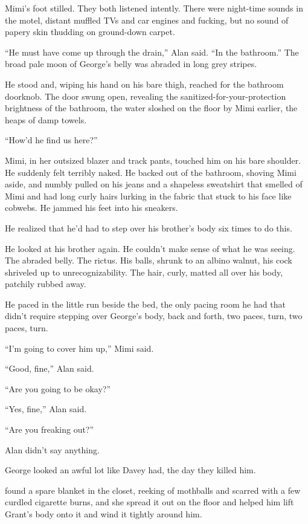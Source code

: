 Mimi's foot stilled.  They both listened intently.  There were
night-time sounds in the motel, distant muffled TVs and car engines
and fucking, but no sound of papery skin thudding on ground-down
carpet.

``He must have come up through the drain,'' Alan said.  ``In the
bathroom.'' The broad pale moon of George's belly was abraded in long
grey stripes.

He stood and, wiping his hand on his bare thigh, reached for the
bathroom doorknob.  The door swung open, revealing the
sanitized-for-your-protection brightness of the bathroom, the water
sloshed on the floor by Mimi earlier, the heaps of damp towels.

``How'd he find us here?''

Mimi, in her outsized blazer and track pants, touched him on his bare
shoulder.  He suddenly felt terribly naked.  He backed out of the
bathroom, shoving Mimi aside, and numbly pulled on his jeans and a
shapeless sweatshirt that smelled of Mimi and had long curly hairs
lurking in the fabric that stuck to his face like cobwebs.  He jammed
his feet into his sneakers.

He realized that he'd had to step over his brother's body six times to
do this.

He looked at his brother again.  He couldn't make sense of what he was
seeing.  The abraded belly.  The rictus.  His balls, shrunk to an
albino walnut, his cock shriveled up to unrecognizability.  The hair,
curly, matted all over his body, patchily rubbed away.

He paced in the little run beside the bed, the only pacing room he had
that didn't require stepping over George's body, back and forth, two
paces, turn, two paces, turn.

``I'm going to cover him up,'' Mimi said.

``Good, fine,'' Alan said.

``Are you going to be okay?''

``Yes, fine,'' Alan said.

``Are you freaking out?''

Alan didn't say anything.

George looked an awful lot like Davey had, the day they killed him.

 found a spare blanket in the closet, reeking of mothballs and
scarred with a few curdled cigarette burns, and she spread it out on
the floor and helped him lift Grant's body onto it and wind it tightly
around him.

